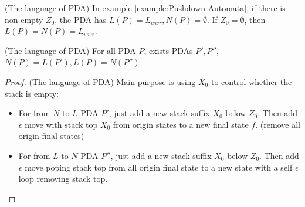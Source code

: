         \begin{example}
            (The language of PDA) In example \ref{example:Pushdown Automata}, if there is non-empty $Z_0$, the PDA has $L(P)=L_{wwr},N(P)=\emptyset$. If $Z_0=\emptyset$, then $L(P)=N(P)=L_{wwr}$.
        \end{example}
        \begin{theorem}
            (The language of PDA) For all PDA $P$, exists PDAs $P',P''$, $N(P)=L(P'),L(P)=N(P'')$.
        \end{theorem}
        \begin{proof}
            (The language of PDA) Main purpose is using $X_0$ to control whether the stack is empty:
            \begin{itemize}
                \item For from $N$ to $L$ PDA $P'$, just add a new stack suffix $X_0$ below $Z_0$. Then add $\epsilon$ move with stack top $X_0$ from origin states to a new final state $f$. (remove all origin final states)
                \item For from $L$ to $N$ PDA $P''$, just add a new stack suffix $X_0$ below $Z_0$. Then add $\epsilon$ move poping stack top from all origin final state to a new state with a self $\epsilon$ loop removing stack top.
            \end{itemize}
        \end{proof}

